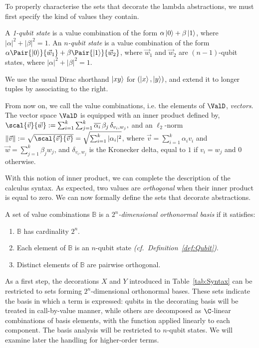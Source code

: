 To properly characterise the sets that decorate the lambda abstractions, we
must first specify the kind of values they contain.
\begin{definition}[Qubits]\label{def:Qubit}
  A \emph{1-qubit state} is a value combination of the form
  $\alpha\left\vert{0}\right\rangle + \beta\left\vert{1}\right\rangle$, where $|\alpha|^2 + |\beta|^2 = 1$. An
  \emph{$n$-qubit state} is a value combination of the form
  $\alpha\Pair{\ket{0}}{\vec{w}_{1}} + \beta\Pair{\ket{1}}{\vec{w}_{2}}$, where
  $\vec{w}_{1}$ and $\vec{w}_{2}$ are $(n-1)$-qubit states,
  where $|\alpha|^2 + |\beta|^2 = 1$.
\end{definition}
We use the usual Dirac shorthand $\left\vert{xy}\right\rangle$ for $(\left\vert{x}\right\rangle,\left\vert{y}\right\rangle)$, and
extend it to longer tuples by associating to the right.

From now on, we call the value combinations, i.e. the elements of $\ValD$,
\emph{vectors}. The vector space $\ValD$ is equipped with an inner
product defined by,  
\(
  \scal{\vec{v}}{\vec{w}} := \sum_{i=1}^k\sum_{j=1}^k
  \overline{\alpha_i}\,\beta_j\,\delta_{v_i,w_j},
\)
and an $\ell_2$-norm 
\(
  \|\vec{v}\| := \sqrt{\scal{\vec{v}}{\vec{v}}}
  = \sqrt{\sum_{i=1}^k|\alpha_i|^2}
\),
where $\vec{v}=\sum_{i=1}^k\alpha_i v_i$ and
$\vec{w}=\sum_{j=1}^k\beta_j w_j$, and $\delta_{v_i,w_j}$ is the Kronecker
delta, equal to $1$ if $v_i=w_j$ and $0$ otherwise.

With this notion of inner product, we can complete the description of the
calculus syntax. As expected, two values are \emph{orthogonal} when their inner
product is equal to zero. We can now formally define the sets that
decorate abstractions.
\begin{definition}[Basis]\label{def:NthDimensionalBasis}
  A set of value combinations $\mathbb{B}$ is a \emph{$2^n$-dimensional orthonormal
  basis} if it satisfies:
  \begin{enumerate}
    \item $\mathbb{B}$ has cardinality $2^n$.
    \item Each element of $\mathbb{B}$ is an $n$-qubit state \emph{(cf.~Definition~\ref{def:Qubit})}.
    \item Distinct elements of $\mathbb{B}$ are pairwise orthogonal.
  \end{enumerate}
\end{definition}

As a first step, the decorations $X$ and $Y$ introduced in Table~\ref{tab:Syntax}
can be restricted to sets forming $2^n$-dimensional
orthonormal bases. These sets indicate the basis in which a term is expressed:
qubits in the decorating basis will be treated in call-by-value manner, while
others are decomposed as $\C$-linear combinations of basis elements, with the
function applied linearly to each component. The basis analysis will be
restricted to $n$-qubit states. We will examine later the handling for
higher-order terms.


